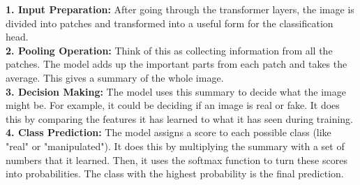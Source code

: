 \noindent \textbf{1. Input Preparation:} After going through the transformer layers, the image is divided into patches and transformed into a useful form for the classification head.
\\

\noindent \textbf{2. Pooling Operation:} Think of this as collecting information from all the patches. The model adds up the important parts from each patch and takes the average. This gives a summary of the whole image.
\\

\noindent \textbf{3. Decision Making:} The model uses this summary to decide what the image might be. For example, it could be deciding if an image is real or fake. It does this by comparing the features it has learned to what it has seen during training.
\\

\noindent \textbf{4. Class Prediction:} The model assigns a score to each possible class (like "real" or "manipulated"). It does this by multiplying the summary with a set of numbers that it learned. Then, it uses the softmax function to turn these scores into probabilities. The class with the highest probability is the final prediction.



